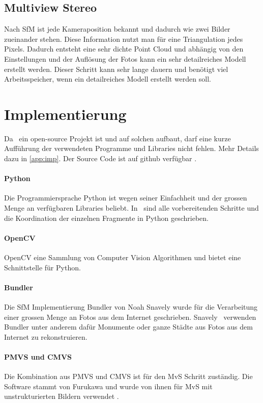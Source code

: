 		\subsection{Multiview Stereo} \label{mvs}
			Nach SfM ist jede Kameraposition bekannt und dadurch wie zwei Bilder zueinander stehen. Diese Information nutzt man für eine Triangulation jedes Pixels. Dadurch entsteht eine sehr dichte Point Cloud und abhängig von den Einstellungen und der Auflösung der Fotos kann ein sehr detailreiches Modell erstellt werden.
			Dieser Schritt kann sehr lange dauern und benötigt viel Arbeitsspeicher, wenn ein detailreiches Modell erstellt werden soll.

	\section{Implementierung}  \label{imp:tech}
		Da \dronarch\ ein open-source Projekt ist und auf solchen aufbaut, darf eine kurze Aufführung der verwendeten Programme und Libraries nicht fehlen. Mehr Details dazu in \autoref{app:imp}. Der Source Code ist auf github verfügbar .
		
		\paragraph{Python}
			Die Programmiersprache Python  ist wegen seiner Einfachheit und der grossen Menge an verfügbaren Libraries beliebt.
			In \dronarch\ sind alle vorbereitenden Schritte und die Koordination der einzelnen Fragmente in Python geschrieben.
			
		\paragraph{OpenCV}
			OpenCV  eine Sammlung von Computer Vision Algorithmen und bietet eine Schnittstelle für Python.
						
		\paragraph{Bundler}
			Die SfM Implementierung Bundler  von Noah Snavely wurde für die Verarbeitung einer grossen Menge an Fotos aus dem Internet geschrieben. Snavely \etal\ verwenden Bundler unter anderem dafür Monumente  oder ganze Städte  aus Fotos aus dem Internet zu rekonstruieren.

		\paragraph{PMVS und CMVS}
			Die Kombination aus PMVS  und CMVS  ist für den MvS Schritt zuständig. Die Software stammt von Furukawa \etal {} und wurde von ihnen für MvS mit unstrukturierten Bildern verwendet .
		